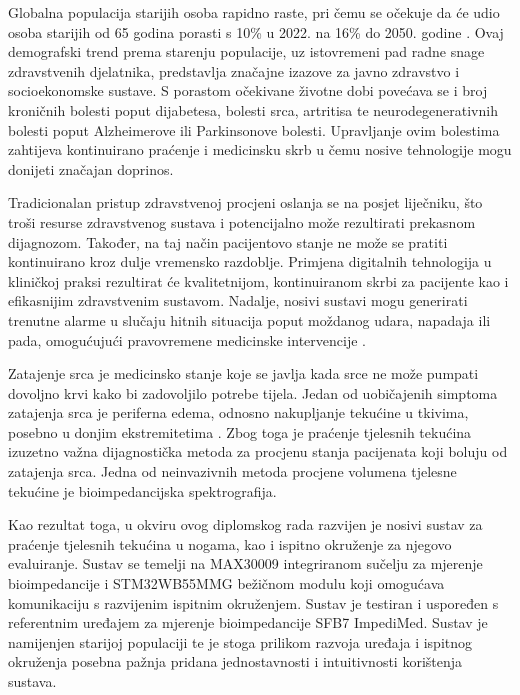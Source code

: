 \documentclass[../diplomski_rad.tex]{subfiles}
\begin{document}
\sloppy

\justifying

Globalna populacija starijih osoba rapidno raste, pri čemu se očekuje da će udio osoba 
starijih od 65 godina porasti s 10\% u 2022. na 16\% do 2050. godine \cite{Chen2023}. 
Ovaj demografski trend prema starenju populacije, uz istovremeni pad radne snage zdravstvenih djelatnika, predstavlja značajne izazove za 
javno zdravstvo i socioekonomske sustave. 
S porastom očekivane životne dobi povećava se i broj kroničnih bolesti poput dijabetesa, 
bolesti srca, artritisa te neurodegenerativnih bolesti poput Alzheimerove ili Parkinsonove bolesti. 
Upravljanje ovim bolestima zahtijeva kontinuirano praćenje i medicinsku skrb u čemu 
nosive tehnologije mogu donijeti značajan doprinos. 

Tradicionalan pristup zdravstvenoj procjeni oslanja se na posjet liječniku, što troši resurse zdravstvenog sustava 
i potencijalno može rezultirati prekasnom dijagnozom. 
Također, na taj način pacijentovo stanje ne može se pratiti kontinuirano kroz dulje vremensko razdoblje.
Primjena digitalnih tehnologija u kliničkoj praksi rezultirat će kvalitetnijom, kontinuiranom skrbi za pacijente kao i 
efikasnijim zdravstvenim sustavom. 
Nadalje, nosivi sustavi mogu generirati trenutne alarme u slučaju hitnih situacija poput moždanog udara, 
napadaja ili pada, omogućujući pravovremene medicinske intervencije \cite{Chen2023}.

Zatajenje srca je medicinsko stanje koje se javlja kada srce ne može pumpati dovoljno krvi kako bi 
zadovoljilo potrebe tijela. Jedan od uobičajenih simptoma zatajenja srca je periferna edema, odnosno nakupljanje 
tekućine u tkivima, posebno u donjim ekstremitetima \cite{Abassi2022}. Zbog toga je praćenje tjelesnih tekućina izuzetno važna 
dijagnostička metoda za procjenu stanja pacijenata koji boluju od zatajenja srca. Jedna od neinvazivnih metoda 
procjene volumena tjelesne tekućine je bioimpedancijska spektrografija. 

Kao rezultat toga, u okviru ovog diplomskog rada razvijen je nosivi sustav za praćenje tjelesnih tekućina u nogama, 
kao i ispitno okruženje za njegovo evaluiranje. 
Sustav se temelji na MAX30009 integriranom sučelju za mjerenje bioimpedancije i STM32WB55MMG bežičnom modulu koji omogućava komunikaciju 
s razvijenim ispitnim okruženjem. Sustav je testiran i uspoređen s referentnim uređajem za mjerenje bioimpedancije SFB7 ImpediMed.
Sustav je namijenjen starijoj populaciji te je stoga prilikom razvoja uređaja i ispitnog okruženja 
posebna pažnja pridana jednostavnosti i intuitivnosti korištenja sustava. 
\end{document}
